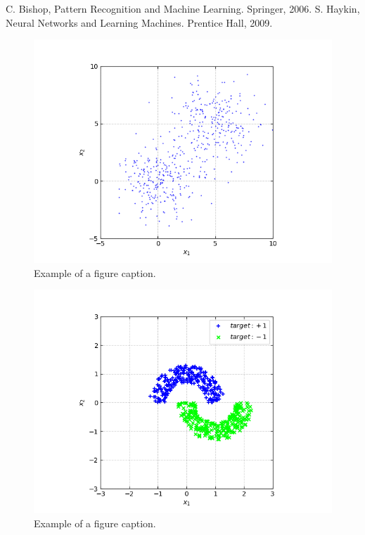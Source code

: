 \documentclass[conference]{IEEEtran}
\begin{document}
\begin{thebibliography}{00}
 C. Bishop, Pattern Recognition and Machine Learning. Springer, 2006.
 S. Haykin, Neural Networks and Learning Machines. Prentice Hall, 2009.
\end{thebibliography}

\begin{figure}[p!]
\centerline{\includegraphics[trim=70 0 85 0, clip, width=\columnwidth]{Figure_1.png}}
\caption{Example of a figure caption.}
\label{fig:circgauss}
\end{figure}

\begin{figure}[p!]
\centerline{\includegraphics[trim=60 0 85 0, clip, width=\columnwidth]{Figure_2.png}}
\caption{Example of a figure caption.}
\label{fig:doublemoon}
\end{figure}
\end{document}
